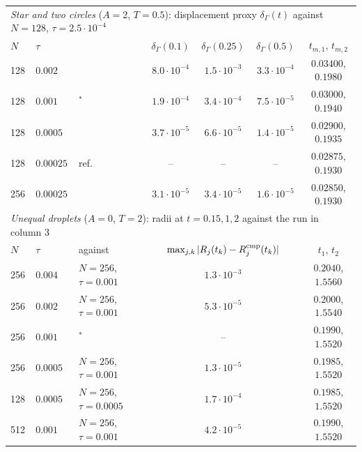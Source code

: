 \begin{tabular}{lllcccc}
\toprule
\multicolumn{7}{l}{\emph{Star and two circles} ($A=2$, $T=0.5$): displacement proxy $\delta_\Gamma(t)$ against $N=128$, $\tau=2.5\cdot10^{-4}$}\\
$N$ & $\tau$ & & $\delta_\Gamma(0.1)$ & $\delta_\Gamma(0.25)$ & $\delta_\Gamma(0.5)$ & $t_{m,1}$, $t_{m,2}$\\
\midrule
128 & $0.002$ &  & $8.0\cdot10^{-4}$ & $1.5\cdot10^{-3}$ & $3.3\cdot10^{-4}$ & $0.03400$, $0.1980$\\
128 & $0.001$ & $^\ast$ & $1.9\cdot10^{-4}$ & $3.4\cdot10^{-4}$ & $7.5\cdot10^{-5}$ & $0.03000$, $0.1940$\\
128 & $0.0005$ &  & $3.7\cdot10^{-5}$ & $6.6\cdot10^{-5}$ & $1.4\cdot10^{-5}$ & $0.02900$, $0.1935$\\
128 & $0.00025$ & ref. & -- & -- & -- & $0.02875$, $0.1930$\\
256 & $0.00025$ &  & $3.1\cdot10^{-5}$ & $3.4\cdot10^{-5}$ & $1.6\cdot10^{-5}$ & $0.02850$, $0.1930$\\
\midrule
\multicolumn{7}{l}{\emph{Unequal droplets} ($A=0$, $T=2$): radii at $t=0.15,1,2$ against the run in column 3}\\
$N$ & $\tau$ & against & \multicolumn{3}{c}{$\max_{j,k}|R_j(t_k)-R_j^{\rm cmp}(t_k)|$} & $t_1$, $t_2$\\
\midrule
256 & $0.004$ & $N=256$, $\tau=0.001$ & \multicolumn{3}{c}{$1.3\cdot10^{-3}$} & $0.2040$, $1.5560$\\
256 & $0.002$ & $N=256$, $\tau=0.001$ & \multicolumn{3}{c}{$5.3\cdot10^{-5}$} & $0.2000$, $1.5540$\\
256 & $0.001$ & $^\ast$ & \multicolumn{3}{c}{--} & $0.1990$, $1.5520$\\
256 & $0.0005$ & $N=256$, $\tau=0.001$ & \multicolumn{3}{c}{$1.3\cdot10^{-5}$} & $0.1985$, $1.5520$\\
128 & $0.0005$ & $N=256$, $\tau=0.0005$ & \multicolumn{3}{c}{$1.7\cdot10^{-4}$} & $0.1985$, $1.5520$\\
512 & $0.001$ & $N=256$, $\tau=0.001$ & \multicolumn{3}{c}{$4.2\cdot10^{-5}$} & $0.1990$, $1.5520$\\
\bottomrule
\end{tabular}
